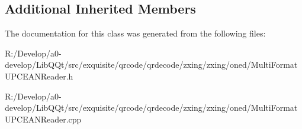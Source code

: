 \subsection*{Additional Inherited Members}


The documentation for this class was generated from the following files\+:\begin{DoxyCompactItemize}
\item 
R\+:/\+Develop/a0-\/develop/\+Lib\+Q\+Qt/src/exquisite/qrcode/qrdecode/zxing/zxing/oned/Multi\+Format\+U\+P\+C\+E\+A\+N\+Reader.\+h\item 
R\+:/\+Develop/a0-\/develop/\+Lib\+Q\+Qt/src/exquisite/qrcode/qrdecode/zxing/zxing/oned/Multi\+Format\+U\+P\+C\+E\+A\+N\+Reader.\+cpp\end{DoxyCompactItemize}
